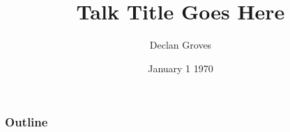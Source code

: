 \documentclass[t]{beamer}
\title{Talk Title Goes Here}
\author{Declan Groves}
\date{January 1 1970}
\begin{document}
\begin{frame}
\titlepage
\end{frame}

\begin{frame}
\frametitle{Outline}
\tableofcontents
\end{frame}


\end{document}
